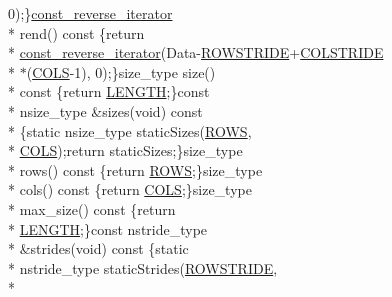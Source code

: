 \begin{DoxyCompactItemize}
0);\}\hyperlink{classvct_fixed_size_const_matrix_base_a86918b3da51e15dce72b62abdc6378fa}{const\-\_\-reverse\-\_\-iterator} \\*
rend() const \{return \\*
\hyperlink{classvct_fixed_size_const_matrix_base_a86918b3da51e15dce72b62abdc6378fa}{const\-\_\-reverse\-\_\-iterator}(Data-\/\hyperlink{classvct_fixed_size_const_matrix_base_a0aa9b864b8810dd6a50640c965564bd0a1249f054e777d0972eee94e9e33c3f4f}{R\-O\-W\-S\-T\-R\-I\-D\-E}+\hyperlink{classvct_fixed_size_const_matrix_base_a0aa9b864b8810dd6a50640c965564bd0aee4513ad3dee685fdda1bc2c264be993}{C\-O\-L\-S\-T\-R\-I\-D\-E} \\*
$\ast$(\hyperlink{classvct_fixed_size_const_matrix_base_a05da4a844e1880e31d3052abb9a8063ba99583531bd0415ad92eed81fc931d592}{C\-O\-L\-S}-\/1), 0);\}size\-\_\-type size() \\*
const \{return \hyperlink{classvct_fixed_size_const_matrix_base_a05da4a844e1880e31d3052abb9a8063ba3a9b8b3d119455a4b5f4a6553a707f92}{L\-E\-N\-G\-T\-H};\}const \\*
nsize\-\_\-type \&sizes(void) const \\*
\{static nsize\-\_\-type static\-Sizes(\hyperlink{classvct_fixed_size_const_matrix_base_a05da4a844e1880e31d3052abb9a8063ba628eeb65016492a84b40dad539262735}{R\-O\-W\-S}, \\*
\hyperlink{classvct_fixed_size_const_matrix_base_a05da4a844e1880e31d3052abb9a8063ba99583531bd0415ad92eed81fc931d592}{C\-O\-L\-S});return static\-Sizes;\}size\-\_\-type \\*
rows() const \{return \hyperlink{classvct_fixed_size_const_matrix_base_a05da4a844e1880e31d3052abb9a8063ba628eeb65016492a84b40dad539262735}{R\-O\-W\-S};\}size\-\_\-type \\*
cols() const \{return \hyperlink{classvct_fixed_size_const_matrix_base_a05da4a844e1880e31d3052abb9a8063ba99583531bd0415ad92eed81fc931d592}{C\-O\-L\-S};\}size\-\_\-type \\*
max\-\_\-size() const \{return \\*
\hyperlink{classvct_fixed_size_const_matrix_base_a05da4a844e1880e31d3052abb9a8063ba3a9b8b3d119455a4b5f4a6553a707f92}{L\-E\-N\-G\-T\-H};\}const nstride\-\_\-type \\*
\&strides(void) const \{static \\*
nstride\-\_\-type static\-Strides(\hyperlink{classvct_fixed_size_const_matrix_base_a0aa9b864b8810dd6a50640c965564bd0a1249f054e777d0972eee94e9e33c3f4f}{R\-O\-W\-S\-T\-R\-I\-D\-E}, \\*

\end{DoxyCompactItemize}
